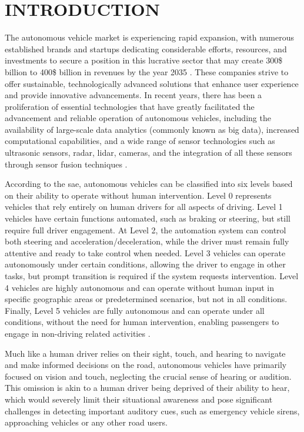     \chapter{INTRODUCTION}
\label{chp:introduction}

The autonomous vehicle market is experiencing rapid expansion, with numerous established brands and startups dedicating considerable efforts, resources, and investments to secure a position in this lucrative sector that may create 300\$ billion to 400\$ billion in revenues by the year 2035 \cite{McKinsey2023}. These companies strive to offer sustainable, technologically advanced solutions that enhance user experience and provide innovative advancements. In recent years, there has been a proliferation of essential technologies that have greatly facilitated the advancement and reliable operation of autonomous vehicles, including the availability of large-scale data analytics (commonly known as big data), increased computational capabilities, and a wide range of sensor technologies such as ultrasonic sensors, \gls{radar}, \gls{lidar}, cameras, and the integration of all these sensors through sensor fusion techniques \cite{Hussain2018}.

According to the \gls{sae}, autonomous vehicles can be classified into six levels based on their ability to operate without human intervention. Level 0 represents vehicles that rely entirely on human drivers for all aspects of driving. Level 1 vehicles have certain functions automated, such as braking or steering, but still require full driver engagement. At Level 2, the automation system can control both steering and acceleration/deceleration, while the driver must remain fully attentive and ready to take control when needed. Level 3 vehicles can operate autonomously under certain conditions, allowing the driver to engage in other tasks, but prompt transition is required if the system requests intervention. Level 4 vehicles are highly autonomous and can operate without human input in specific geographic areas or predetermined scenarios, but not in all conditions. Finally, Level 5 vehicles are fully autonomous and can operate under all conditions, without the need for human intervention, enabling passengers to engage in non-driving related activities \cite{SAE2021}.

Much like a human driver relies on their sight, touch, and hearing to navigate and make informed decisions on the road, autonomous vehicles have primarily focused on vision and touch, neglecting the crucial sense of hearing or audition. This omission is akin to a human driver being deprived of their ability to hear, which would severely limit their situational awareness and pose significant challenges in detecting important auditory cues, such as emergency vehicle sirens, approaching vehicles or any other road users.

